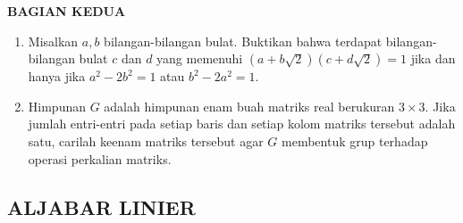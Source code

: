 \documentclass[12pt,twoside]{article}
\begin{document}
\newpage \textbf{BAGIAN KEDUA}
\begin{enumerate}
	\item Misalkan $a,b$ bilangan-bilangan bulat. Buktikan bahwa terdapat bilangan-bilangan bulat $c$ dan $d$ yang memenuhi $(a+b\sqrt{2})(c+d\sqrt{2}) = 1$ jika dan hanya jika $a^2-2b^2 = 1$ atau $b^2-2a^2 = 1$.

	\item Himpunan $G$ adalah himpunan enam buah matriks real berukuran $3 \times 3$. Jika jumlah entri-entri pada setiap baris dan setiap kolom matriks tersebut adalah satu, carilah keenam matriks tersebut agar $G$ membentuk grup terhadap operasi perkalian matriks.
\end{enumerate}


\newpage \subsection{ALJABAR LINIER }
\end{document}
